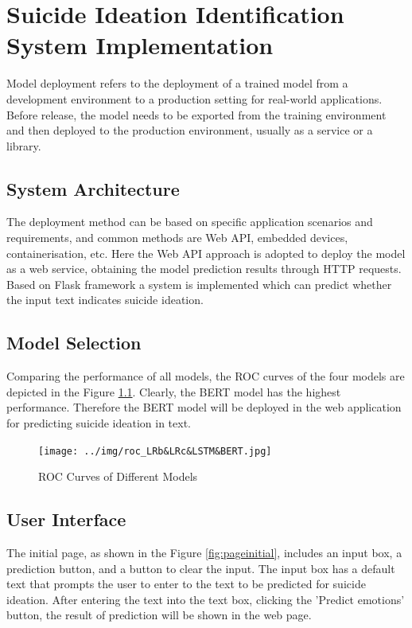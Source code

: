 \documentclass[ %
                    author={Bocheng Wang},
                supervisor={Dr. Qiang Liu},
                    degree={MSc},
                     title={A Research on Identification of Suicide Ideation in Texts with Multiple Models},
                      type={},
                      year={2024}]{dissertation}
\begin{document}

\chapter{Suicide Ideation Identification System Implementation}
\label{chap:implementation}
\noindent
Model deployment refers to the deployment of a trained model from a development environment to a production setting for real-world applications. Before release, the model needs to be exported from the training environment and then deployed to the production environment, usually as a service or a library. 

\section{System Architecture}
\noindent
The deployment method can be based on specific application scenarios and requirements, and common methods are Web API, embedded devices, containerisation, etc. Here the Web API approach is adopted to deploy the model as a web service, obtaining the model prediction results through HTTP requests. Based on Flask framework a system is implemented which can predict whether the input text indicates suicide ideation.

\section{Model Selection}
\noindent
Comparing the performance of all models, the ROC curves of the four models are depicted in the Figure \ref{fig:rocs}. Clearly, the BERT model has the highest performance. Therefore the BERT model will be deployed in the web application for predicting suicide ideation in text.

\begin{figure}[h]
      \centering
      \texttt{[image: ../img/roc\_LRb\&LRc\&LSTM\&BERT.jpg]}
      \caption{ROC Curves of Different Models}
      \label{fig:rocs}
\end{figure}

\section{User Interface}
The initial page, as shown in the Figure \ref{fig:pageinitial}, includes an input box, a prediction button, and a button to clear the input. The input box has a default text that prompts the user to enter to the text to be predicted for suicide ideation. After entering the text into the text box, clicking the 'Predict emotions' button, the result of prediction will be shown in the web page.
\end{document}
